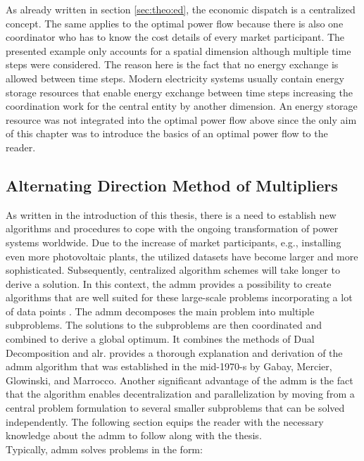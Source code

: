 As already written in section \ref{sec:theo:ed}, the economic dispatch is a centralized concept. The same applies to the optimal power flow because there is also one coordinator who has to know the cost details of every market participant. The presented example only accounts for a spatial dimension although multiple time steps were considered. The reason here is the fact that no energy exchange is allowed between time steps. Modern electricity systems usually contain energy storage resources that enable energy exchange between time steps increasing the coordination work for the central entity by another dimension. An energy storage resource was not integrated into the optimal power flow above since the only aim of this chapter was to introduce the basics of an optimal power flow to the reader.

\subsection{Alternating Direction Method of Multipliers}
\label{sec:theo:admm}

As written in the introduction of this thesis, there is a need to establish new algorithms and procedures to cope with the ongoing transformation of power systems worldwide. Due to the increase of market participants, e.g., installing even more photovoltaic plants, the utilized datasets have become larger and more sophisticated. Subsequently, centralized algorithm schemes will take longer to derive a solution. In this context, the \gls{admm} provides a possibility to create algorithms that are well suited for these large-scale problems incorporating a lot of data points \citep{boyd2010}. The \gls{admm} decomposes the main problem into multiple subproblems. The solutions to the subproblems are then coordinated and combined to derive a global optimum. It combines the methods of Dual Decomposition and \gls{alr}. \citet{boyd2010} provides a thorough explanation and derivation of the \gls{admm} algorithm that was established in the mid-1970-s by Gabay, Mercier, Glowinski, and Marrocco. Another significant advantage of the \gls{admm} is the fact that the algorithm enables decentralization and parallelization by moving from a central problem formulation to several smaller subproblems that can be solved independently. The following section equips the reader with the necessary knowledge about the \gls{admm} to follow along with the thesis.\\

Typically, \gls{admm} solves problems in the form:


